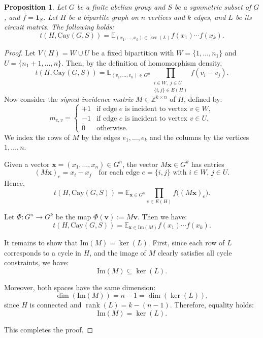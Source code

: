 \documentclass[12pt,a4paper]{article}
\theoremstyle{definition}
\theoremstyle{plain}
\newtheorem{prop}[theorem]{Proposition}
\theoremstyle{definition}
\begin{document}
\begin{prop}\label{trantomatrix}
    Let $G$ be a finite abelian group and $S$ be a symmetric subset of $G$, and $f=\mathbf{1}_S$. Let $H$ be a bipartite graph on $n$ vertices and $k$ edges, and $L$ be its circuit matrix. The following holds:
    \[
    t(H,\mathrm{Cay}(G, S))=\mathbb{E}_{(x_1, \dots, x_k) \in \ker(L)} f(x_1) \cdots f(x_k).
    \]
\end{prop}
\begin{proof}
Let $V(H) = W \cup U$ be a fixed bipartition with $W = \{1, \dots, n_1\}$ and $U = \{n_1 + 1, \dots, n\}$. Then, by the definition of homomorphism density,
\[
t(H, \mathrm{Cay}(G, S))
= \mathbb{E}_{(v_1, \dots, v_n) \in G^n}
\prod_{\substack{i \in W,\; j \in U \\ \{i,j\} \in E(H)}}
f(v_i - v_j).
\]
Now consider the \emph{signed incidence matrix} $M \in \mathbb{Z}^{k \times n}$ of $H$, defined by:
\[
m_{e,v} =
\begin{cases}
+1 & \text{if edge $e$ is incident to vertex $v \in W$}, \\
-1 & \text{if edge $e$ is incident to vertex $v \in U$}, \\
0 & \text{otherwise}.
\end{cases}
\]
We index the rows of $M$ by the edges $e_1, \dots, e_k$ and the columns by the vertices $1, \dots, n$.

Given a vector $\boldsymbol{x} = (x_1, \dots, x_n) \in G^n$, the vector $M\boldsymbol{x} \in G^k$ has entries
\[
(M\boldsymbol{x})_e = x_i - x_j \quad \text{for each edge } e = \{i, j\} \text{ with } i \in W,\, j \in U.
\]
Hence,
\[
t(H, \mathrm{Cay}(G, S)) = \mathbb{E}_{\boldsymbol{x} \in G^n} \prod_{e \in E(H)} f\big((M\boldsymbol{x})_e\big).
\]

Let $\Phi: G^n \to G^k$ be the map $\Phi(\boldsymbol{v}) := M\boldsymbol{v}$. Then we have:
\[
t(H, \mathrm{Cay}(G, S)) = \mathbb{E}_{\boldsymbol{x} \in \mathrm{Im}(M)} f(x_1)\cdots f(x_k).
\]

It remains to show that $\mathrm{Im}(M) = \ker(L)$. First, since each row of $L$ corresponds to a cycle in $H$, and the image of $M$ clearly satisfies all cycle constraints, we have:
\[
\mathrm{Im}(M) \subseteq \ker(L).
\]

Moreover, both spaces have the same dimension:
\[
\dim (\mathrm{Im}(M)) = n - 1 = \dim (\ker(L)),
\]
since $H$ is connected and $\operatorname{rank}(L) = k - (n - 1)$. Therefore, equality holds:
\[
\mathrm{Im}(M) = \ker(L).
\]

This completes the proof.
\end{proof}
\end{document}
